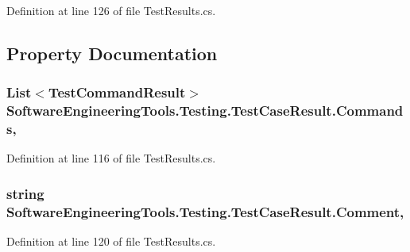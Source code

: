 Definition at line 126 of file Test\+Results.\+cs.



\subsection{Property Documentation}
\hypertarget{class_software_engineering_tools_1_1_testing_1_1_test_case_result_a234642830cddb778e4cbff58c11c4b37}{
\subsubsection[{Commands}]{\setlength{\rightskip}{0pt plus 5cm}List$<${\bf Test\+Command\+Result}$>$ Software\+Engineering\+Tools.\+Testing.\+Test\+Case\+Result.\+Commands\hspace{0.3cm}{\ttfamily [get]}, {\ttfamily [set]}}}\label{class_software_engineering_tools_1_1_testing_1_1_test_case_result_a234642830cddb778e4cbff58c11c4b37}


Definition at line 116 of file Test\+Results.\+cs.

\hypertarget{class_software_engineering_tools_1_1_testing_1_1_test_case_result_a46e72de12e8afe5255484cdfcd3849b0}{
\subsubsection[{Comment}]{\setlength{\rightskip}{0pt plus 5cm}string Software\+Engineering\+Tools.\+Testing.\+Test\+Case\+Result.\+Comment\hspace{0.3cm}{\ttfamily [get]}, {\ttfamily [set]}}}\label{class_software_engineering_tools_1_1_testing_1_1_test_case_result_a46e72de12e8afe5255484cdfcd3849b0}


Definition at line 120 of file Test\+Results.\+cs.

